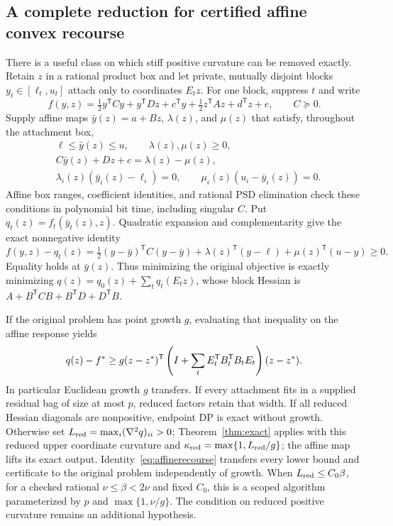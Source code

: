 \subsection{A complete reduction for certified affine convex recourse}
There is a useful class on which stiff positive curvature can be removed
exactly. Retain $z$ in a rational product box and let private, mutually
disjoint blocks $y_t\in[\ell_t,u_t]$ attach only to coordinates $E_tz$.
For one block, suppress $t$ and write
\[
f(y,z)=\tfrac12y^{\mathsf T}Cy+y^{\mathsf T}Dz+c^{\mathsf T}y
+\tfrac12z^{\mathsf T}Az+d^{\mathsf T}z+e,\qquad C\succeq0.
\]
Supply affine maps $\bar y(z)=a+Bz$, $\lambda(z)$, and $\mu(z)$
that satisfy, throughout the attachment box,
\begin{align*}
&\ell\le\bar y(z)\le u,\qquad\lambda(z),\mu(z)\ge0,\\
&C\bar y(z)+Dz+c=\lambda(z)-\mu(z),\\
&\lambda_i(z)(\bar y_i(z)-\ell_i)=0,
\qquad\mu_i(z)(u_i-\bar y_i(z))=0.
\end{align*}
Affine box ranges, coefficient identities, and rational PSD elimination
check these conditions in polynomial bit time, including singular $C$.
Put $q_t(z)=f_t(\bar y_t(z),z)$. Quadratic expansion and
complementarity give the exact nonnegative identity
\begin{equation}\label{eq:affinerecourse}
f(y,z)-q_t(z)=\tfrac12(y-\bar y)^{\mathsf T}C(y-\bar y)
+\lambda(z)^{\mathsf T}(y-\ell)+\mu(z)^{\mathsf T}(u-y)\ge0.
\end{equation}
Equality holds at $\bar y(z)$. Thus minimizing the original objective
is exactly minimizing $q(z)=q_0(z)+\sum_tq_t(E_tz)$, whose block
Hessian is $A+B^{\mathsf T}CB+B^{\mathsf T}D+D^{\mathsf T}B$.

If the original problem has point growth $g$, evaluating that inequality
on the affine response yields
\begin{equation}\label{eq:affinemetric}
q(z)-f^*\ge g(z-z^*)^{\mathsf T}
\left(I+\sum_tE_t^{\mathsf T}B_t^{\mathsf T}B_tE_t\right)(z-z^*).
\end{equation}
In particular Euclidean growth $g$ transfers. If every attachment fits
in a supplied residual bag of size at most $p$, reduced factors retain
that width. If all reduced Hessian diagonals are nonpositive, endpoint
DP is exact without growth. Otherwise set
$L_{\rm red}=\max_i(\nabla^2q)_{ii}>0$; Theorem~\ref{thm:exact}
applies with this reduced upper coordinate curvature and
$\kappa_{\rm red}=\max\{1,L_{\rm red}/g\}$; the affine map lifts its
exact output. Identity~\eqref{eq:affinerecourse} transfers every lower
bound and certificate to the original problem independently of growth.
When $L_{\rm red}\le C_0\beta$, for a checked rational
$\nu\le\beta<2\nu$ and fixed $C_0$, this is a scoped algorithm
parameterized by $p$ and $\max\{1,\nu/g\}$. The condition on reduced
positive curvature remains an additional hypothesis.

